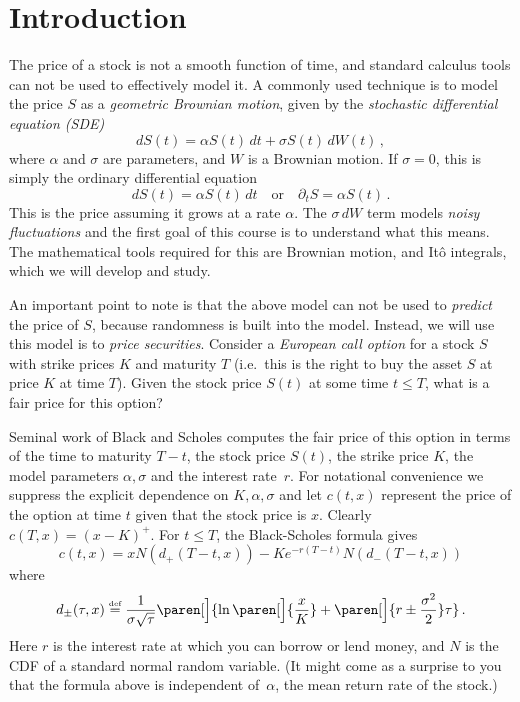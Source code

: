 
\chapter{Introduction}

The price of a stock is not a smooth function of time, and standard calculus tools can not be used to effectively model it.
A commonly used technique is to model the price $S$ as a \emph{geometric Brownian motion}, given by the \emph{stochastic differential equation (SDE)}
\begin{equation*}
  dS(t) = \alpha S(t) \, dt + \sigma S(t) \, dW(t)\,,
\end{equation*}
where $\alpha$ and $\sigma$ are parameters, and $W$ is a Brownian motion.
If $\sigma = 0$, this is simply the ordinary differential equation
\begin{equation*}
  dS(t) = \alpha S(t) \, dt
  \quad\text{or}\quad
  \partial_t S = \alpha S(t)\,.
\end{equation*}
This is the price assuming it grows at a rate $\alpha$.
The $\sigma \, dW$ term models \emph{noisy fluctuations} and the first goal of this course is to understand what this means.
The mathematical tools required for this are Brownian motion, and It\^o integrals, which we will develop and study.

An important point to note is that the above model can not be used to \emph{predict} the price of $S$, because randomness is built into the model.
Instead, we will use this model is to \emph{price securities}.
Consider a \emph{European call option} for a stock $S$ with strike prices $K$ and maturity $T$ (i.e.\ this is the right to buy the asset $S$ at price $K$ at time $T$).
Given the stock price $S(t)$ at some time $t \leq T$, what is a fair price for this option?

Seminal work of Black and Scholes computes the fair price of this option in terms of the time to maturity $T - t$, the stock price $S(t)$, the strike price $K$, the model parameters $\alpha, \sigma$ and the interest rate~$r$.
For notational convenience we suppress the explicit dependence on $K, \alpha, \sigma$ and let $c(t, x)$ represent the price of the option at time $t$ given that the stock price is $x$.
Clearly $c(T, x) = (x - K)^+$.
For $t \leq T$, the Black-Scholes formula gives
\begin{equation*}
  c(t, x) = x N( d_+(T - t, x) ) - Ke^{-r (T-t)} N( d_-(T-t, x) )
\end{equation*}
where
\begin{equation*}
  d_\pm( \tau, x ) \defeq
    \frac{1}{\sigma \sqrt{\tau}}\paren[\Big]{
	\ln\paren[\Big]{\frac{x}{K}}
	+ \paren[\Big]{ r \pm \frac{\sigma^2}{2} } \tau
      }\,.
\end{equation*}
Here $r$ is the interest rate at which you can borrow or lend money, and $N$ is the CDF of a standard normal random variable.
(It might come as a surprise to you that the formula above is independent of~$\alpha$, the mean return rate of the stock.)

